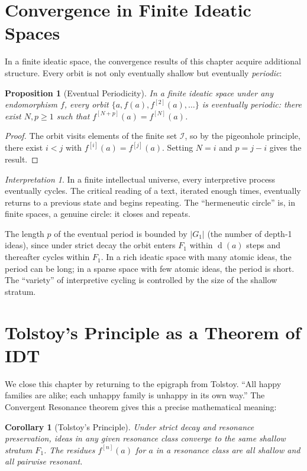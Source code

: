 \documentclass[11pt,openany]{book}
\theoremstyle{definition}
\theoremstyle{plain}
\newtheorem{proposition}[axiom]{Proposition}
\newtheorem{corollary}[axiom]{Corollary}
\theoremstyle{remark}
\newtheorem{interpretation}[axiom]{Interpretation}
\newcommand{\IS}{\mathcal{I}}               %
\newcommand{\depth}{\operatorname{d}}       %
\begin{document}
\section{Convergence in Finite Ideatic Spaces}

In a finite ideatic space, the convergence results of this chapter acquire additional structure. Every orbit is not only eventually shallow but eventually \emph{periodic}:

\begin{proposition}[Eventual Periodicity]
In a finite ideatic space under any endomorphism $f$, every orbit $\{a, f(a), f^{[2]}(a), \ldots\}$ is eventually periodic: there exist $N, p \geq 1$ such that $f^{[N+p]}(a) = f^{[N]}(a)$.
\end{proposition}

\begin{proof}
The orbit visits elements of the finite set $\IS$, so by the pigeonhole principle, there exist $i < j$ with $f^{[i]}(a) = f^{[j]}(a)$. Setting $N = i$ and $p = j - i$ gives the result.
\end{proof}

\begin{interpretation}
In a finite intellectual universe, every interpretive process eventually cycles. The critical reading of a text, iterated enough times, eventually returns to a previous state and begins repeating. The ``hermeneutic circle'' is, in finite spaces, a genuine circle: it closes and repeats.

The length $p$ of the eventual period is bounded by $|G_1|$ (the number of depth-1 ideas), since under strict decay the orbit enters $F_1$ within $\depth(a)$ steps and thereafter cycles within $F_1$. In a rich ideatic space with many atomic ideas, the period can be long; in a sparse space with few atomic ideas, the period is short. The ``variety'' of interpretive cycling is controlled by the size of the shallow stratum.
\end{interpretation}

\section{Tolstoy's Principle as a Theorem of IDT}

We close this chapter by returning to the epigraph from Tolstoy. ``All happy families are alike; each unhappy family is unhappy in its own way.'' The Convergent Resonance theorem gives this a precise mathematical meaning:

\begin{corollary}[Tolstoy's Principle]
Under strict decay and resonance preservation, ideas in any given resonance class converge to the same shallow stratum $F_1$. The residues $f^{[n]}(a)$ for $a$ in a resonance class are all shallow and all pairwise resonant.
\end{corollary}
\end{document}
